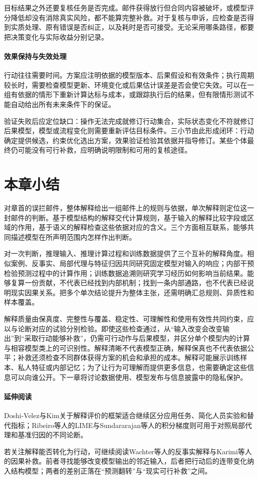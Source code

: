 目标结果之外还要复核任务是否完成。邮件获得放行但合同内容被破坏，或模型评分降低却没有消除真实风险，都不能算完整补救。对于复核与申诉，应检查是否得到实质处理、原有错误是否纠正，以及耗时是否可接受。无论采用哪条路径，都要把决策变化与实际收益分别记录。

\paragraph{效果保持与失效处理}

行动往往需要时间。方案应注明依据的模型版本、后果假设和有效条件；执行周期较长时，需要检查模型更新、环境变化或后果估计误差是否会使它失效。可以在一组有依据的情形下重新计算达标与成本，或跟踪执行后的结果，但有限情形测试不能自动给出所有未来条件下的保证。

验证失败后应定位缺口：操作无法完成就修订行动集合，实际状态变化不符就修订后果模型，模型或流程变化则需要重新评估目标条件。三小节由此形成闭环：行动确定提供候选，约束优化选出方案，效果验证检验其依据并指导修订。某些个体最终仍可能没有可行补救，应明确说明限制和可用的复核途径。

\section{本章小结}
\label{sec:interpretability-summary}

对章首的误拦邮件，整体解释给出一组邮件上的规则与依据，单次解释则定位这一封邮件的判断。基于模型结构的解释交代计算规则，基于输入的解释比较字段或区域的作用，基于语义的解释检查这些依据对应的含义。三个方面相互联系，能够共同描述模型在所声明范围内怎样作出判断。

对一次判断，推理输入、推理计算过程和训练数据提供了三个互补的解释角度。相似案例、反事实、局部代理与特征归因共同研究固定模型对输入的响应；内部干预检验预测过程中的计算作用；训练数据追溯则研究学习经历如何影响当前结果。能够复算一份贡献，不代表已经找到内部机制；找到一条内部通路，也不代表已经说明现实因果关系。把多个单次结论提升为整体主张，还需明确汇总规则、异质性和样本覆盖。

解释质量由保真度、完整性与覆盖、稳定性、可理解性和使用有效性共同约束，应以与论断对应的试验分别检验。即使这些检查通过，从“输入改变会改变输出”到“采取行动能够补救”，仍需可行动作与后果模型，并区分单个模型内的计算与相容模型类上的可识别性。解释清晰不代表模型正确，解释保真也不代表依据公平；补救还须检查不同群体获得方案的机会和承担的成本。解释可能展示训练样本、私人特征或内部记忆；为了让行为可理解而提供更多信息，也需要确定这些信息可以向谁公开。下一章将讨论数据使用、模型发布与信息披露中的隐私保护。

\paragraph{延伸阅读}

Doshi-Velez与Kim关于解释评价的框架适合继续区分应用任务、简化人员实验和替代指标；Ribeiro等人的LIME与Sundararajan等人的积分梯度则可用于对照局部代理和基准归因的不同论断。

若关注解释能否转化为行动，可继续阅读Wachter等人的反事实解释与Karimi等人的因果补救。前者寻找能够改变模型输出的邻近输入，后者把行动后的连带变化纳入结构模型；两者的差别正落在“预测翻转”与“现实可行补救”之间。
